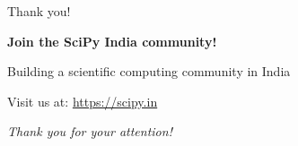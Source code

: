 \documentclass[16pt,t]{beamer}
\begin{document}
\begin{frame}{Thank you!}
\begin{center}
\Large
\textbf{Join the SciPy India community!}

\vspace{1cm}

\large
Building a scientific computing community in India

\vspace{1cm}

\normalsize
Visit us at: \url{https://scipy.in}

\vspace{0.5cm}

\vspace{1cm}

\textit{Thank you for your attention!}
\end{center}
\end{frame}



% 
\end{document}
